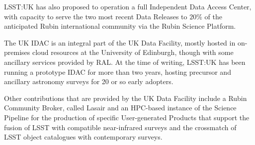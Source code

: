 LSST:UK has also proposed to operation a full Independent Data Access Center, with capacity to serve the two most recent Data Releases to $20\%$ of the anticipated Rubin international community via the Rubin Science Platform.

The UK IDAC is an integral part of the UK Data Facility, mostly hosted in on-premises cloud resources at the University of Edinburgh, though with some ancillary services provided by RAL. At the time of writing, LSST:UK has been running a prototype IDAC for more than two years, hosting precursor and ancillary astronomy surveys for 20 or so early adopters.

Other contributions that are provided by the UK Data Facility include a Rubin Community Broker, called Lasair and an HPC-based instance of the Science Pipeline for the production of specific User-generated Products that support the fusion of LSST with compatible near-infrared surveys and the crossmatch of LSST object catalogues with contemporary surveys.
